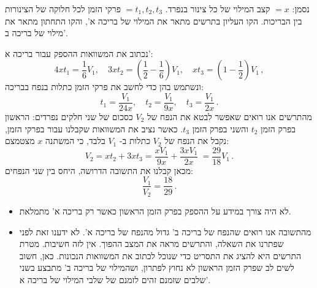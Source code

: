 \documentclass[12pt,a4paper]{article}
\begin{document}
\begin{center}
\end{center}


נסמן:
$=x$
קצב המילוי של כל צינור בנפרד. 
$=t_1, t_2, t_3$
פרקי הזמן לכל חלוקה של הצינורות בין הבריכות. הקו העליון בתרשים מתאר את המילוי של בריכה א', והקו התחתון מתאר את מילוי של בריכה ב'.

נכתוב את המשוואות ההספק עבור בריכה א':
\[
4x t_1 = \frac{1}{6}V_1,\quad 3x t_2 = (\frac{1}{2}-\frac{1}{6})V_1,\quad xt_3=(1-\frac{1}{2})V_1\,,
\]
ונשתמש בהן כדי לחשב את פרקי הזמן כתלות בנפח בבריכה:
\[
t_1 = \frac{V_1}{24x},\quad t_2 = \frac{V_1}{9x},\quad t_3=\frac{V_1}{2x}\,.
\]
מהתרשים אנו רואים שאפשר לבטא את הנפח של
$V_2$
כסכום של שני חלקים נפרדים: הראשון בפרק הזמן
$t_2$
והשני בפרק הזמן
$t_3$.
כאשר נציב את המשוואות שקבלנו עבור בפרקי הזמן, נקבל את הנפח של
$V_2$
כתלות ב-%
$V_1$
בלבד, כי המשתנה 
$x$ מצטמצם:
\[
V_2 = xt_2 + 3xt_3 = \frac{x V_1}{9x} + \frac{3x V_1}{2x}\ = \frac{29}{18}V_1\,.
\]
מכאן קבלנו את התשובה הדרושה, היחס בין שני הנפחים:
\[
\frac{V_1}{V_2} = \frac{18}{29}\,.
\]
\begin{itemize}
\item 
לא היה צורך במידע על ההספק בפרק הזמן הראשון כאשר רק בריכה א' מתמלאת.
\item
מהתשובה אנו רואים שהנפח של בריכה ב' גדול מהנפח של בריכה א'. לא ידענו זאת לפני שפתרנו את השאלה, והתרשים מראה את המצב ההפוך. אין לזה חשיבות. מטרת התרשים היא להציג את התסריט כדי שנוכל לכתוב את המשוואות הנכונות. כאן, חשוב לשים לב שפרק הזמן הראשון לא נחוץ לפתרון, ושהמילוי של בריכה ב' מתבצע בשני שלבים שזמנם זהים לזמנם של שלבי המילוי של בריכה א'.

\end{itemize}
\end{document}
